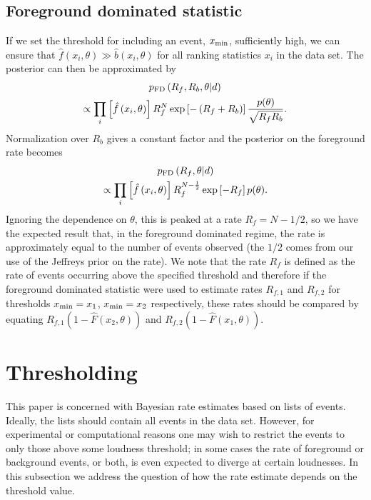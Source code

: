 \documentclass[aps,prd,reprint,nofootinbib]{revtex4-1}
\begin{document}
\subsection{Foreground dominated statistic}
If we set the threshold for including an event, $x_{\rm min}$,
sufficiently high, we can ensure that $\hat{f}(x_i,\theta) \gg
\hat{b}(x_i,\theta)$ for all ranking statistics $x_i$ in the data
set. The posterior can then be approximated by
\begin{multline}
p_{\rm FD}\left( R_f, R_b, \theta | d \right) \\ \propto \prod_{i} \left[
  \hat{f}\left(x_i, \theta\right)\right] R_f^N \exp\left[-\left( R_f +
  R_b \right) \right] \frac{p(\theta)}{\sqrt{R_f R_b}}.
\end{multline}
Normalization over $R_b$ gives a constant factor and the posterior on
the foreground rate becomes
\begin{multline}
p_{\rm FD}\left( R_f, \theta | d \right) \\ \propto \prod_{i} \left[
  \hat{f}\left(x_i, \theta\right)\right] R_f^{N-\frac{1}{2}}
\exp\left[-R_f \right] p(\theta).
\end{multline}
Ignoring the dependence on $\theta$, this is peaked at a rate $R_f =
N-1/2$, so we have the expected result that, in the foreground
dominated regime, the rate is approximately equal to the number of
events observed (the $1/2$ comes from our use of the Jeffreys prior on
the rate).  We note that the rate $R_f$ is defined as the rate of
events occurring above the specified threshold and therefore if the
foreground dominated statistic were used to estimate rates $R_{f,1}$
and $R_{f,2}$ for thresholds $x_{\rm min}=x_1$, $x_{\rm min}=x_2$
respectively, these rates should be compared by equating $R_{f,1}
(1-\hat{F}(x_2,\theta))$ and $R_{f,2} (1-\hat{F}(x_1,\theta))$.

\section{Thresholding}
This paper is concerned with Bayesian rate estimates based on lists of
events.  Ideally, the lists should contain all events in the data set.
However, for experimental or computational reasons one may wish to
restrict the events to only those above some loudness threshold; in
some cases the rate of foreground or background events, or both, is
even expected to diverge at certain loudnesses.  In this subsection we
address the question of how the rate estimate depends on the threshold
value.
\end{document}

